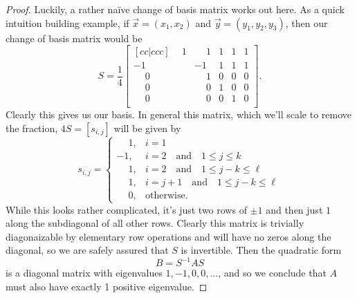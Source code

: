 \documentclass[12pt,oneside]{../../sfsuthesis}
\begin{document}
\begin{proof}
    Luckily, a rather na\"ive change of basis matrix works out here.
    As a quick intuition building example, if \( \vec{x} = ( x_1, x_2) \) and \( \vec{y} = (y_1, y_2, y_3) \), then our change of basis matrix would be
    \[
        S = \frac{1}{4}
        \begin{bmatrix}[cc|ccc]
            \phantom{-}1 & \phantom{-}1 & 1 & 1 & 1 \\
            -1           & -1           & 1 & 1 & 1 \\
            \phantom{-}0 & \phantom{-}1 & 0 & 0 & 0 \\
            \phantom{-}0 & \phantom{-}0 & 1 & 0 & 0 \\
            \phantom{-}0 & \phantom{-}0 & 0 & 1 & 0 \\
        \end{bmatrix}.
    \]
    Clearly this gives us our basis.
    In general this matrix, which we'll scale to remove the fraction, \( 4S = [s_{i,j}] \) will be given by
    \[
        s_{i,j}  = \begin{cases}
            \phantom{-}1, & i = 1                                                  \\
            -1,           & i = 2 \quad \text{and} \quad 1 \leq j \leq k           \\
            \phantom{-}1, & i = 2 \quad \text{and} \quad 1 \leq j-k \leq \ell      \\
            \phantom{-}1, & i = j + 1  \quad \text{and} \quad 1 \leq j-k \leq \ell \\
            \phantom{-}0, & \text{otherwise}.
        \end{cases}
    \]
    While this looks rather complicated, it's just two rows of \( \pm 1 \) and then just \( 1 \) along the subdiagonal of all other rows.
    Clearly this matrix is trivially diagonaizable by elementary row operations and will have no zeros along the diagonal, so we are safely assured that \( S \) is invertible.
    Then the quadratic form
    \[
        B = S^{-1}AS
    \]
    is a diagonal matrix with eigenvalues \( 1, -1, 0, 0, \dots \), and so we conclude that \( A \) must also have exactly 1 positive eigenvalue.


\end{proof}
\end{document}
